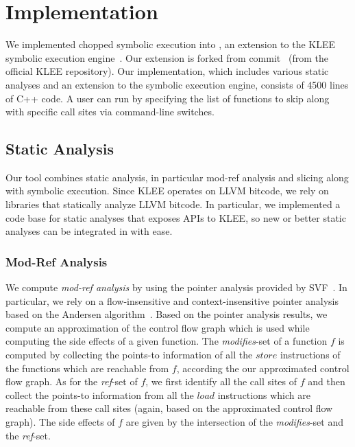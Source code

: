 
\chapter{Implementation}\label{chapter:implementation}

We implemented chopped symbolic execution into \toolname, an extension
to the KLEE symbolic execution
engine~\cite{klee}.
Our extension is forked from commit~ (from the official KLEE repository).
Our implementation, which includes various static analyses
and an extension to the symbolic execution engine,
consists of 4500 lines of C++ code.
A user can run \toolname by
specifying the list of functions to skip along with specific call
sites via command-line switches.

\section{Static Analysis}
Our tool combines static analysis, in particular mod-ref analysis and slicing
along with symbolic execution.
Since KLEE operates on LLVM bitcode, we rely on libraries
that statically analyze LLVM bitcode.
In particular, we implemented a code base for static analyses that exposes APIs to KLEE, so new or
better static analyses can be integrated in \toolname with ease.

\subsection{Mod-Ref Analysis}
We compute \textit{mod-ref analysis} by using the pointer analysis
provided by SVF~\cite{sui2016svf}. In particular, we rely on a
flow-insensitive and context-insensitive pointer analysis based on the
Andersen algorithm~\cite{andersen:pointeranalysis}.
Based on the pointer analysis results,
we compute an approximation of the control flow graph
which is used while computing the side effects of a given function.
The \textit{modifies}-set of a function $f$ is computed
by collecting the points-to information of all the $store$ instructions of the functions which
are reachable from $f$, according the our approximated control flow graph.
As for the \textit{ref}-set of $f$, we first identify all the call sites of $f$
and then collect the points-to information from all the $load$ instructions which are reachable
from these call sites (again, based on the approximated control flow graph).
The side effects of $f$ are given by the intersection of the \textit{modifies}-set and the \textit{ref}-set.


